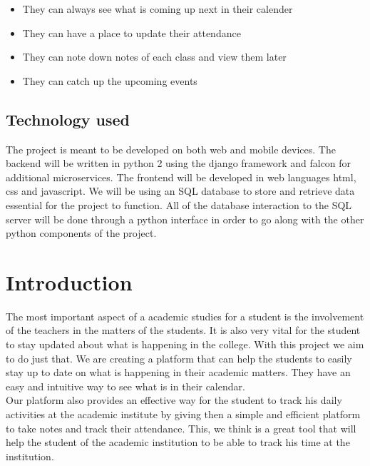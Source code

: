 \documentclass{article}
\begin{document}
\begin{itemize}
\item They can always see what is coming up next in their calender
\item They can have a place to update their attendance
\item They can note down notes of each class and view them later
\item They can catch up the upcoming events
\end{itemize}

\subsection{Technology used}

The project is meant to be developed on both web and mobile devices. The backend will be written in python 2 using the django framework and falcon for additional microservices. The frontend will be developed in web languages html, css and javascript. We will be using an SQL database to store and retrieve data essential for the project to function. All of the database interaction to the SQL server will be done through a python interface in order to go along with the other python components of the project.

\newpage

\section{Introduction}
\hspace{1em}

\Large
The most important aspect of a academic studies for a student is the involvement of the teachers in the matters of the students. It is also very vital for the student to stay updated about what is happening in the college. With this project we aim to do just that. We are creating a platform that can help the students to easily stay up to date on what is happening in their academic matters. They have an easy and intuitive way to see what is in their calendar.\\

\vspace{1em}
\Large
Our platform also provides an effective way for the student to track his daily activities at the academic institute by giving then a simple and efficient platform to take notes and track their attendance. This, we think is a great tool that will help the student of the academic institution to be able to track his time at the institution.\\
\end{document}
